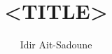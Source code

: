 
\usepackage{stmaryrd}
%
%
\usepackage{textcomp}
\usepackage{xcolor}
\usepackage{paralist}
\usepackage{listings}
\usepackage{lstisadof}
\usepackage{xspace}

\newcommand{\fixIsarList}{\vspace{-\topsep}\vspace{-\baselineskip}\mbox{}\\[0pt]\noindent}

\title{<TITLE>}
\author{Idir Ait-Sadoune}
